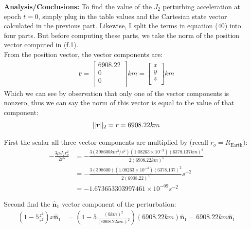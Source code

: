 \documentclass[titlepage]{article}
\begin{document}
\textbf{Analysis/Conclusions:}
To find the value of the $J_2$ perturbing acceleration at epoch $t=0$, simply plug in the table values and the Cartesian state vector calculated in the previous part. Likewise, I split the terms in equation (40) into four parts. But before computing these parts, we take the norm of the position vector computed in (f.1).\\

From the position vector, the vector components are:
\begin{equation}
	\begin{split}
		\boldsymbol{r} = 
		\begin{bmatrix}
			6908.22 \\
			0 \\
			0 \\
		\end{bmatrix}km=
		\begin{bmatrix}
			x \\
			y \\
			z \\
		\end{bmatrix}km
	\end{split}
\end{equation}
Which we can see by observation that only one of the vector components is nonzero, thus we can say the norm of this vector is equal to the value of that component:
\begin{equation}
	\|\boldsymbol{r}\|_2 = r = 6908.22km \\
\end{equation}

First the scalar all three vector components are multiplied by (recall $r_o=R_{\text{Earth}})$:
\begin{equation}
	\begin{split}
		-\frac{3\mu J_2 r_o^2}{2r^5}&=-\frac{3(398600km^3/s^2)  (1.08263\times10^{-3}) (6378.137km)^2}{2(6908.22km)^5} \\
		&=-\frac{3(398600)  (1.08263\times10^{-3}) (6378.137)^2}{2(6908.22)^5}s^{-2} \\
		&=-1.673653303997461\times 10^{-09 }s^{-2}
	\end{split}
\end{equation}

Second find the $\boldsymbol{\hat{n}}_1$ vector component of the perturbation:
\begin{equation}
	\begin{split}
		\left(1-5\frac{z^2}{r^2}\right)x\hat{\boldsymbol{n}}_1&=\left(1-5\frac{(0km)^2}{(6908.22km)^2}\right)(6908.22km)\hat{\boldsymbol{n}}_1=6908.22km\hat{\boldsymbol{n}}_1\\
	\end{split}
\end{equation}
\end{document}
